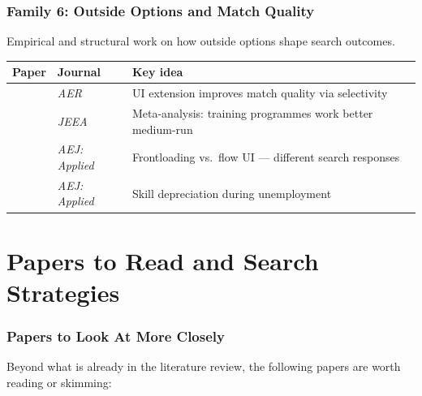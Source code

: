 \documentclass[12pt]{article}
\begin{document}
\section{Family 6: Outside Options and Match Quality}

Empirical and structural work on how outside options shape search outcomes.

\begin{longtable}{p{4.5cm} p{3.5cm} p{6cm}}
\toprule
\textbf{Paper} & \textbf{Journal} & \textbf{Key idea} \\
\midrule
\endhead
\citet{nekoei2017} & \emph{AER} & UI extension improves match quality via selectivity \\[6pt]
\citet{card2018} & \emph{JEEA} & Meta-analysis: training programmes work better medium-run \\[6pt]
\citet{lindner2020} & \emph{AEJ: Applied} & Frontloading vs.\ flow UI --- different search responses \\[6pt]
\citet{cohen2025} & \emph{AEJ: Applied} & Skill depreciation during unemployment \\
\bottomrule
\end{longtable}


\newpage
\part{Papers to Read and Search Strategies}

\section{Papers to Look At More Closely}

Beyond what is already in the literature review, the following papers are worth reading or skimming:
\end{document}
